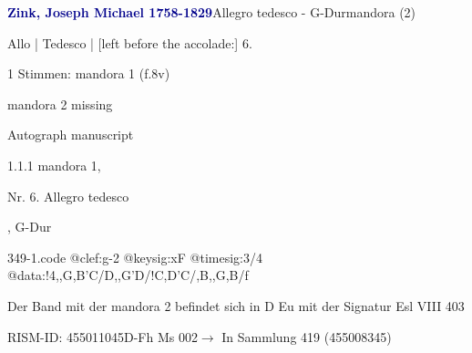 \documentclass[twocolumn, 12pt]{book}
\begin{document}
\par \vspace{16pt} \textcolor{darkblue}{\textbf{Zink, Joseph Michael  1758-1829}}\hfillplus{\textbf{[349]}}\newline Allegro tedesco - G-Dur\newline mandora (2)
\par \begin{itshape}[f.8v, at left:] Allo | Tedesco | [left before the accolade:] 6.\end{itshape} 
\par \textcolor{darkblue}{}  1 Stimmen: mandora 1  (f.8v)\newline \begin{small} mandora 2 missing\end{small} \newline Autograph manuscript
\par 1.1.1  mandora 1, \begin{itshape}Nr. 6. Allegro tedesco\end{itshape}, G-Dur  
\begin{filecontents*}{349-1.code}
@clef:g-2
@keysig:xF
@timesig:3/4
@data:!4,,G,B'C/D,,G'D/!C,D'C/,B,,G,B/f
\end{filecontents*}
\newline %
\par Der Band mit der mandora 2 befindet sich in D Eu mit der Signatur Esl VIII 403
\par RISM-ID: 455011045\newline D-Fh  Ms 002\newline $\rightarrow$ In Sammlung 419 (455008345)
      
\end{document}
